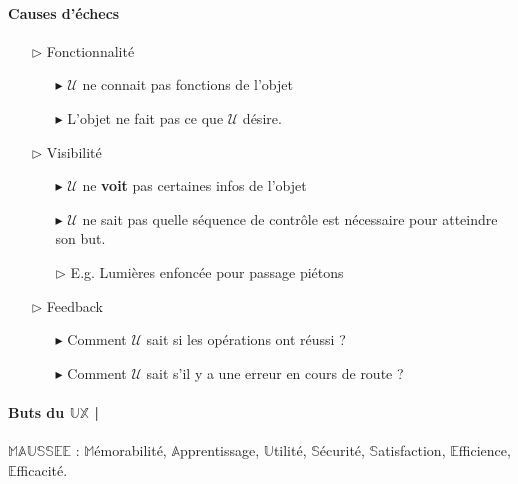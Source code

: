 \documentclass{report}
\begin{document}
\begin{multicols*}{3}
    \paragraph{Causes d'échecs}
    \begin{itemize}
        \item[$\rhd$] Fonctionnalité 
            \begin{itemize}
                \item[$\blacktriangleright$] $\mathcal{U}$ ne connait pas fonctions de l'objet
                \item[$\blacktriangleright$] L'objet ne fait pas ce que  
                    $\mathcal{U}$ désire. 
            \end{itemize}
        \item[$\rhd$] Visibilité 
            \begin{itemize}
                \item[$\blacktriangleright$] $\mathcal{U}$ ne \textbf{voit} 
                    pas certaines infos de l'objet   
                \item[$\blacktriangleright$] 
                    $\mathcal{U}$ ne sait pas quelle séquence de contrôle est nécessaire pour 
                    atteindre son but.  
                \item[$\rhd$] E.g. Lumières enfoncée pour passage piétons
            \end{itemize}
        \item[$\rhd$] Feedback 
            \begin{itemize}
                \item[$\blacktriangleright$] Comment $\mathcal{U}$ 
                    sait si les opérations ont réussi ?
                \item[$\blacktriangleright$] 
                    Comment $\mathcal{U}$ 
                    sait s'il y a une erreur en cours de route ?
            \end{itemize}
    \end{itemize}

    \paragraph{Buts du $\mathbb{UX}$ | }
    $\mathbb{MAUSSEE}$ : $\mathbb{M}$émorabilité, 
    $\mathbb{A}$pprentissage, $\mathbb{U}$tilité,
    $\mathbb{S}$écurité, $\mathbb{S}$atisfaction, 
    $\mathbb{E}$fficience, $\mathbb{E}$fficacité. 


\end{multicols*}
\end{document}
